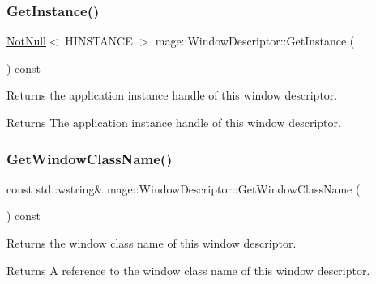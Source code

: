\subsubsection{\texorpdfstring{Get\+Instance()}{GetInstance()}}
{\footnotesize\ttfamily \mbox{\hyperlink{namespacemage_a8769f9d670d6b585ea306cb1062af94b}{Not\+Null}}$<$ H\+I\+N\+S\+T\+A\+N\+CE $>$ mage\+::\+Window\+Descriptor\+::\+Get\+Instance (\begin{DoxyParamCaption}{ }\end{DoxyParamCaption}) const\hspace{0.3cm}{\ttfamily [noexcept]}}

Returns the application instance handle of this window descriptor.

\begin{DoxyReturn}{Returns}
The application instance handle of this window descriptor. 
\end{DoxyReturn}
\mbox{\label{classmage_1_1_window_descriptor_aeb9db711e495a075146d322978de593e}} 
\subsubsection{\texorpdfstring{Get\+Window\+Class\+Name()}{GetWindowClassName()}}
{\footnotesize\ttfamily const std\+::wstring\& mage\+::\+Window\+Descriptor\+::\+Get\+Window\+Class\+Name (\begin{DoxyParamCaption}{ }\end{DoxyParamCaption}) const\hspace{0.3cm}{\ttfamily [noexcept]}}

Returns the window class name of this window descriptor.

\begin{DoxyReturn}{Returns}
A reference to the window class name of this window descriptor. 
\end{DoxyReturn}
\mbox{\label{classmage_1_1_window_descriptor_a539433423c905e8b45d5bc9d895ee79c}} 
